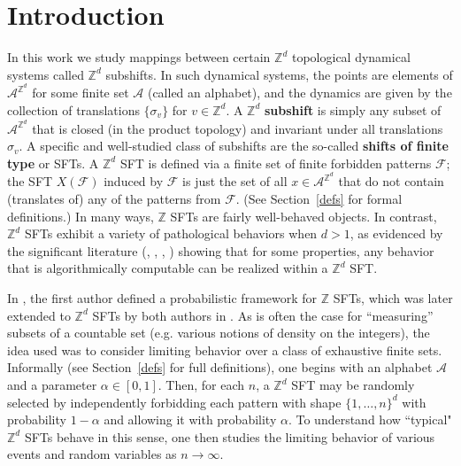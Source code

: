 \documentclass[12pt]{amsart}
\theoremstyle{definition}
\begin{document}
\maketitle

\section{Introduction}


In this work we study mappings between certain $\mathbb{Z}^d$ topological dynamical systems called $\mathbb{Z}^d$ subshifts. 
In such dynamical systems, the points are elements of $\mathcal{A}^{\mathbb{Z}^d}$ for some finite set $\mathcal{A}$ (called an alphabet), and the dynamics are given by the collection of translations $\{\sigma_v\}$ for $v \in \mathbb{Z}^d$. 
A $\mathbb{Z}^d$ \textbf{subshift} is simply any subset of $\mathcal{A}^{\mathbb{Z}^d}$ that is closed (in the product topology) and invariant under all translations $\sigma_v$. 
A specific and well-studied class of subshifts are the so-called \textbf{shifts of finite type} or SFTs. 
A $\mathbb{Z}^d$ SFT is defined via a finite set of finite forbidden patterns $\mathcal{F}$; the SFT $X(\mathcal{F})$ induced by $\mathcal{F}$ is just the set of all $x \in \mathcal{A}^{\mathbb{Z}^d}$ that do not contain (translates of) any of the patterns from $\mathcal{F}$. (See Section~\ref{defs} for formal definitions.) In many ways, $\mathbb{Z}$ SFTs are fairly well-behaved objects. In contrast, $\mathbb{Z}^d$ SFTs exhibit a variety of pathological behaviors when $d > 1$, as evidenced by the significant literature (\cite{Hochman}, \cite{HM}, \cite{JV1}, \cite{JV2}) showing that for some properties, any behavior that is algorithmically computable can be realized within a $\mathbb{Z}^d$ SFT.

In \cite{McGoff}, the first author defined a probabilistic framework for $\mathbb{Z}$ SFTs, which was later extended to $\mathbb{Z}^d$ SFTs by both authors in \cite{McGoffPavlov}. As is often the case for ``measuring'' subsets of a countable set (e.g. various notions of density on the integers), the idea used was to consider limiting behavior over a class of exhaustive finite sets. Informally (see Section~\ref{defs} for full definitions), one begins with an alphabet $\mathcal{A}$ and a parameter $\alpha \in [0,1]$. Then, for each $n$, a $\mathbb{Z}^d$ SFT may be randomly selected by independently forbidding each pattern with shape $\{1,\dots,n\}^d$ with probability $1-\alpha$ and allowing it with probability $\alpha$. To understand how ``typical" $\mathbb{Z}^d$ SFTs behave in this sense, one then studies the limiting behavior of various events and random variables as $n \rightarrow \infty$. 
\end{document}
